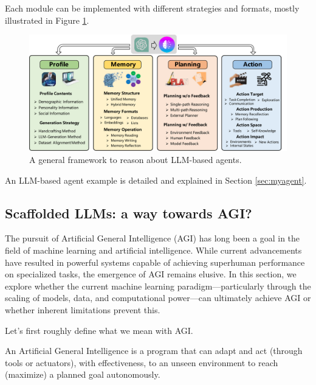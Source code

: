 Each module can be implemented with different strategies and formats, mostly illustrated in Figure \ref{fig: agent}.
\begin{figure}
    \centering
    \includegraphics[width=1\textwidth]{Figures/agent_four_modules.pdf}
    \caption{A general framework to reason about LLM-based agents.}
    \label{fig: agent}
\end{figure}

An LLM-based agent example is detailed and explained in Section \ref{sec:myagent}.

\subsection{Scaffolded LLMs: a way towards AGI?}
The pursuit of Artificial General Intelligence (AGI) has long been a goal in the field of machine learning and artificial intelligence. While current advancements have resulted in powerful systems capable of achieving superhuman performance on specialized tasks, the emergence of AGI remains elusive. In this section, we explore whether the current machine learning paradigm—particularly through the scaling of models, data, and computational power—can ultimately achieve AGI or whether inherent limitations prevent this.

Let's first roughly define what we mean with AGI.
\begin{definition}
    An Artificial General Intelligence is a program that can adapt and act (through tools or actuators), with effectiveness, to an unseen environment to reach (maximize) a planned goal autonomously.
\end{definition}

